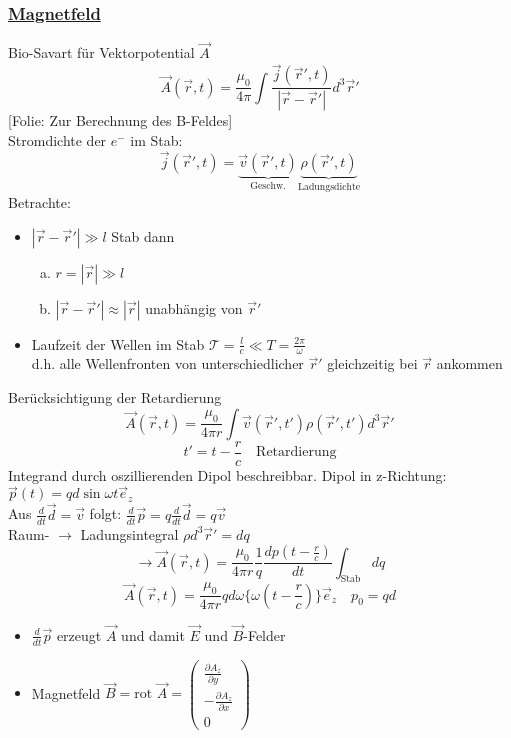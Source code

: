 \documentclass[titlepage,12pt,a4paper,ngerman]{report}
\newcommand{\tx}[1]{\textrm{#1}}
\newcommand{\ub}[1]{\underbrace{#1}}
\newcommand{\folie}[1]{\color{gray}[Folie: #1]\color{black}}
\begin{document}
\subsubsection{\underline{Magnetfeld}}
Bio-Savart für Vektorpotential $ \vec{A} $
$$\vec{A}(\vec{r},t) = \frac{\mu_0}{4 \pi} \int \frac{\vec{j}(\vec{r}',t)}{|\vec{r} - \vec{r}'|} d^3 \vec{r}'$$
\folie{Zur Berechnung des B-Feldes}\\
Stromdichte der $ e^- $ im Stab:
$$\vec{j}(\vec{r}',t) = \ub{\vec{v}(\vec{r}',t)}_{\tx{Geschw.}} \ub{\rho(\vec{r}',t)}_{\tx{Ladungsdichte}}$$
Betrachte:
\begin{itemize}
	\item $ |\vec{r} - \vec{r}'| \gg l $ Stab dann
	\begin{enumerate}[a)]
		\item $ r= |\vec{r}| \gg l $
		\item $ |\vec{r} - \vec{r}'| \approx |\vec{r}| $ unabhängig von $ \vec{r}' $
	\end{enumerate}
	\item Laufzeit der Wellen im Stab $ \mathcal{T} = \frac{l}{c} \ll T = \frac{2 \pi}{\omega}$\\
	d.h. alle Wellenfronten von unterschiedlicher $ \vec{r}' $ gleichzeitig bei $ \vec{r} $ ankommen
\end{itemize}
Berücksichtigung der Retardierung
$$\vec{A} (\vec{r},t) = \frac{\mu_0}{4 \pi r} \int\vec{v} (\vec{r}',t') \rho(\vec{r}',t') d^3 \vec{r}'$$
$$t' = t - \frac{r}{c} \quad \tx{Retardierung}$$
Integrand durch oszillierenden Dipol beschreibbar. Dipol in z-Richtung: $ \vec{p}(t) = q d \sin \omega t \vec{e}_z $\\
Aus $ \frac{d}{dt} \vec{d} = \vec{v} $ folgt: $ \frac{d}{dt} \vec{p} = q \frac{d}{dt} \vec{d} = q \vec{v} $\\[5pt]
Raum- $ \rightarrow $ Ladungsintegral $ \rho d^3 \vec{r}' = d q $
$$\rightarrow \vec{A}(\vec{r},t) = \frac{\mu_0}{4 \pi r} \frac{1}{q} \frac{dp (t-\frac{r}{c})}{dt} \int_{\tx{Stab}} d q$$
$$ \vec{A}(\vec{r},t) = \frac{\mu_0}{4 \pi r} q d \omega\{\omega (t - \frac{r}{c})\} \vec{e}_z  \quad p_0 = qd$$
\begin{itemize}
	\item $ \frac{d}{dt} \vec{p} $ erzeugt $\vec{A}$ und damit $ \vec{E} $ und $ \vec{B} $-Felder
	\item Magnetfeld $ \vec{B}  = \tx{rot } \vec{A} = \begin{pmatrix}
		\frac{\partial A_z}{\partial y} \\
		-\frac{\partial A_z}{\partial x} \\
		0
	\end{pmatrix} $
\end{itemize}
\end{document}
